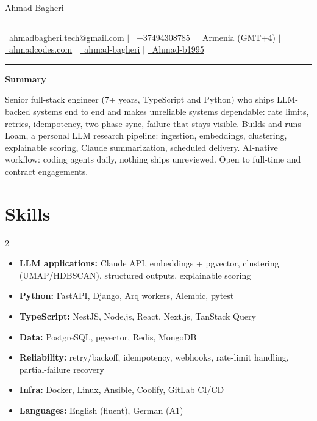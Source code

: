 \documentclass[letterpaper,10pt]{article}
\newcommand{\documentTitle}[2]{
  \begin{center}
    {\Huge\color{accentTitle} #1}
    \vspace{7pt}
    {\color{accentLine} \hrule}
    \vspace{2pt}
    \footnotesize{#2}
    \vspace{2pt}
    {\color{accentLine} \hrule}
  \end{center}
}
\newcommand{\tinysection}[1]{
  \phantomsection
  \addcontentsline{toc}{section}{#1}
  {\large{\bfseries\color{accentText}#1} {\color{accentLine} \textbar}}
}
\begin{document}
  \documentTitle{ Ahmad Bagheri }{
    \href{mailto:ahmadbagheri.tech@gmail.com}{\raisebox{-0.15\height}{\faEnvelope}~ahmadbagheri.tech@gmail.com} \quad$|$\quad
    \href{tel:+37494308785}{\raisebox{-0.15\height}{\faPhone}~+37494308785} \quad$|$\quad
    \raisebox{-0.05\height}{\faMapMarker}~Armenia (GMT+4) \quad$|$\quad
    \href{https://ahmadcodes.com}{\raisebox{-0.15\height}{\faGlobe}~ahmadcodes.com} \quad$|$\quad
    \href{https://www.linkedin.com/in/ahmad-bagheri/}{\raisebox{-0.15\height}{\faLinkedin}~ahmad-bagheri} \quad$|$\quad
    \href{https://github.com/Ahmad-b1995}{\raisebox{-0.15\height}{\faGithub}~Ahmad-b1995}
  }

  \tinysection{Summary}
  Senior full-stack engineer (7+ years, TypeScript and Python) who ships LLM-backed systems end to end and makes unreliable systems dependable: rate limits, retries, idempotency, two-phase sync, failure that stays visible. Builds and runs Loam, a personal LLM research pipeline: ingestion, embeddings, clustering, explainable scoring, Claude summarization, scheduled delivery. AI-native workflow: coding agents daily, nothing ships unreviewed. Open to full-time and contract engagements.

  \section{Skills}
  \begin{multicols}{2}
    \begin{itemize}[itemsep=-2px, parsep=1pt, leftmargin=10pt, label={}]
      \item \textbf{LLM applications:} Claude API, embeddings + pgvector, clustering (UMAP/HDBSCAN), structured outputs, explainable scoring
      \item \textbf{Python:} FastAPI, Django, Arq workers, Alembic, pytest
      \item \textbf{TypeScript:} NestJS, Node.js, React, Next.js, TanStack Query
      \item \textbf{Data:} PostgreSQL, pgvector, Redis, MongoDB
      \item \textbf{Reliability:} retry/backoff, idempotency, webhooks, rate-limit handling, partial-failure recovery
      \item \textbf{Infra:} Docker, Linux, Ansible, Coolify, GitLab CI/CD
      \item \textbf{Languages:} English (fluent), German (A1)
    \end{itemize}
  \end{multicols}
\end{document}
